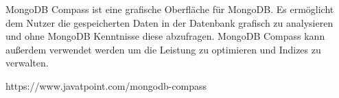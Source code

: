 MongoDB Compass ist eine grafische Oberfläche für MongoDB. Es ermöglicht dem Nutzer die gespeicherten Daten in der Datenbank grafisch zu analysieren und ohne MongoDB Kenntnisse diese abzufragen. MongoDB Compass kann außerdem verwendet werden um die Leistung zu optimieren und Indizes zu verwalten.

https://www.javatpoint.com/mongodb-compass

